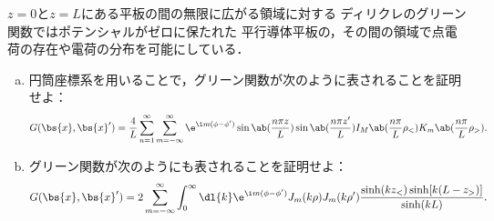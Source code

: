 \begin{bx1}
  $z = 0$と$z = L$にある平板の間の無限に広がる領域に対する
  ディリクレのグリーン関数ではポテンシャルがゼロに保たれた
  平行導体平板の，その間の領域で点電荷の存在や電荷の分布を可能にしている．
  \begin{enumerate}[(a)]%
    \item
      円筒座標系を用いることで，グリーン関数が次のように表されることを証明せよ：
      \begin{gather}%
        G(\bs{x}, \bs{x}') = \frac{4}{L} \sum_{n=1}^\infty\sum_{m=-\infty}^\infty \e^{\i m(\phi - \phi')} \sin\ab(\frac{n\pi z}{L}) \sin\ab(\frac{n\pi z'}{L}) I_M\ab(\frac{n\pi}{L}\rho_<)K_m\ab(\frac{n\pi}{L}\rho_>).
      \end{gather}%
    \item 
      グリーン関数が次のようにも表されることを証明せよ：
      \begin{gather}%
        G(\bs{x}, \bs{x}') = 2 \sum_{m=-\infty}^\infty \int_0^\infty \dl{k} \e^{\i m(\phi - \phi')} J_m(k\rho) J_m(k\rho') \frac{\sinh(kz_<)\sinh[k(L-z_>)]}{\sinh(kL)}.
      \end{gather}%
  \end{enumerate}%

\end{bx1}
\clearpage
